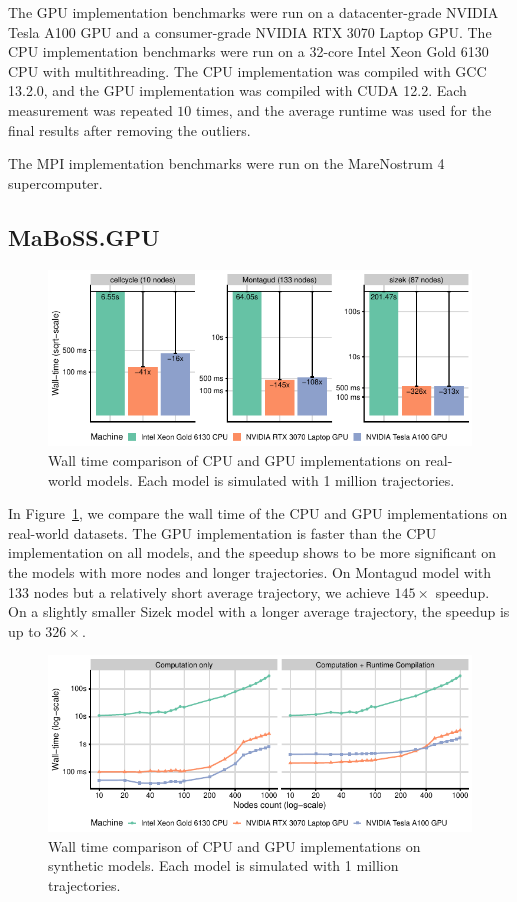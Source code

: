 \documentclass[times, twoside]{zHenriquesLab-StyleBioRxiv}
\begin{document}
The GPU implementation benchmarks were run on a datacenter-grade NVIDIA Tesla A100 GPU and a consumer-grade NVIDIA RTX 3070 Laptop GPU. The CPU implementation benchmarks were run on a 32-core Intel Xeon Gold 6130 CPU with multithreading. The CPU implementation was compiled with GCC 13.2.0, and the GPU implementation was compiled with CUDA 12.2. Each measurement was repeated $10$ times, and the average runtime was used for the final results after removing the outliers.

The MPI implementation benchmarks were run on the MareNostrum 4 supercomputer.


\subsection*{MaBoSS.GPU}

\begin{figure}
    \centering
    \includegraphics[width=\linewidth]{Figures/real.pdf}
    \caption{Wall time comparison of CPU and GPU implementations on real-world models. Each model is simulated with 1 million trajectories.}
    \label{fig:real}
\end{figure}

In Figure~\ref{fig:real}, we compare the wall time of the CPU and GPU implementations on real-world datasets. The GPU implementation is faster than the CPU implementation on all models, and the speedup shows to be more significant on the models with more nodes and longer trajectories. On Montagud model with 133 nodes but a relatively short average trajectory, we achieve $145\times$ speedup. On a slightly smaller Sizek model with a longer average trajectory, the speedup is up to $326\times$. 

\begin{figure}
    \centering
    \includegraphics[width=\linewidth]{Figures/nodes.pdf}
    \caption{Wall time comparison of CPU and GPU implementations on synthetic models. Each model is simulated with 1 million trajectories.}
    \label{fig:synth}
\end{figure}
\end{document}
